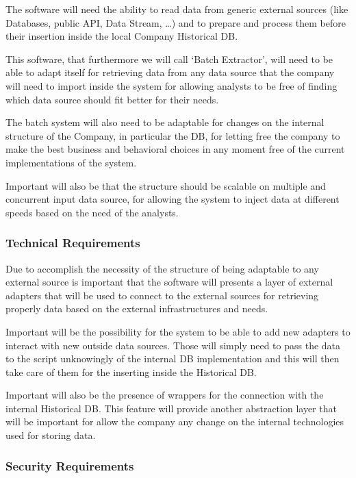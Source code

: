 The software will need the ability to read data from generic external sources (like Databases, public API, Data Stream, …) and to prepare and process them before their insertion inside the local Company Historical DB.

This software, that furthermore we will call ‘Batch Extractor’, will need to be able to adapt itself for retrieving data from any data source that the company will need to import inside the system for allowing analysts to be free of finding which data source should fit better for their needs.

The batch system will also need to be adaptable for changes on the internal structure of the Company, in particular the DB, for letting free the company to make the best business and behavioral choices in any moment free of the current implementations of the system.

Important will also be that the structure should be scalable on multiple and concurrent input data source, for allowing the system to inject data at different speeds based on the need of the analysts.

\subsubsection{Technical Requirements}

Due to accomplish the necessity of the structure of being adaptable to any external source is important that the software will presents a layer of external adapters that will be used to connect to the external sources for retrieving properly data based on the external infrastructures and needs. 

Important will be the possibility for the system to be able to add new adapters to interact with new outside data sources. Those will simply need to pass the data to the script unknowingly of the internal DB implementation and this will then take care of them for the inserting inside the Historical DB.

Important will also be the presence of wrappers for the connection with the internal Historical DB. 
This feature will provide another abstraction layer that will be important for allow the company any change on the internal technologies used for storing data.

\subsubsection{Security Requirements}

